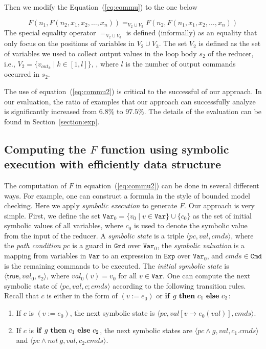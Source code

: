 \documentclass{llncs}
\newcommand{\Var}{\mathtt{Var}}
\newcommand{\Exp}{\mathtt{Exp}}
\newcommand{\Cmd}{\mathtt{Cmd}}
\newcommand{\Grd}{\mathtt{Grd}}
\newcommand{\true}{\mathsf{true}}
\newcommand{\ite}[3]{
	 \ifmmode
	 \mathbf{if}\ #1 \ \mathbf{then}\ #2\  \mathbf{else}\ #3
	 \else
	 \textbf{if}\ #1 \ \textbf{then}\ #2\  \textbf{else}\ #3
	 \fi}
\begin{document}
Then we modify the Equation~(\ref{eq:commu}) to the one below

\begin{equation}
F(n_1, F(n_2,x_1,x_2,\ldots,x_n) )=_{V_2\cup V_3} F(n_2, F(n_1,x_1,x_2,\ldots,x_n) )
\label{eq:commu2}
\end{equation}
The special equality operator $=_{V_2\cup V_3}$ is defined (informally) as an equality that only focus on the positions of variables in $V_2\cup V_3$.
The set $V_2$ is defined as the set of variables we used to collect output values in the loop body $s_2$ of the reducer, i.e., $V_2= \{v_{out_k} \mid k \in [1,l]\}$, , where $l$ is the number of output commands occurred in $s_2$.

The use of equation~(\ref{eq:commu2}) is critical to the successful of our approach. In our evaluation, the ratio of examples that our approach can successfully analyze is significantly increased from $6.8\%$ to $97.5\%$. The details of the evaluation can be found in Section~\ref{section:exp}.

\subsection{Computing the $F$ function using symbolic execution with efficiently data structure}
\label{section:opt2}

The computation of $F$ in equation~(\ref{eq:commu2}) can be done in several different ways. For example, one can construct a formula in the style of bounded model checking. Here we apply \emph{symbolic execution} to generate $F$. Our approach is very simple. First, we define the set $\Var_0=\{v_0 \mid v \in \Var \}\cup \{c_0\}$ as the set of initial symbolic values of all variables, where $c_0$ is used to denote the symbolic value from the input of the reducer.
A \emph{symbolic state} is a triple $\langle pc, val, cmds \rangle$, where the \emph{path condition} $pc$ is a guard in $\Grd$ over $\Var_0$, the \emph{symbolic valuation} is a mapping from variables in $\Var$ to an expression in $\Exp$ over $\Var_0$, and $cmds\in \Cmd$ is the remaining commands to be executed. The \emph{initial symbolic state} is $\langle \true, val_0, s_2\rangle$, where $val_0(v) = v_0$ for all $v\in\Var$.
One can compute the next symbolic state of $\langle pc, val, c;cmds \rangle$ according to the following transition rules. Recall that $c$ is either in the form of $(v:= e_0)$ or $\ite{g}{c_1}{c_2}$:
\begin{enumerate}
	\item If $c$ is $(v:= e_0)$, the next symbolic state is $\langle pc, val[v \rightarrow e_0(val) ], cmds \rangle$.
	\item  If $c$ is $\ite{g}{c_1}{c_2}$, the next symbolic states are $\langle pc\wedge g, val, c_1.cmds \rangle$ and $\langle pc\wedge not\  g, val, c_2.cmds \rangle$.
\end{enumerate}
\end{document}
